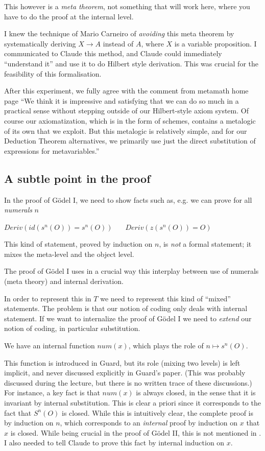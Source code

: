 \documentclass[11pt]{article}
\theoremstyle{plain}
\theoremstyle{definition}
\theoremstyle{remark}
\newcommand{\rta}{\rightarrow}
\begin{document}
This however is a {\em meta theorem}, not something that will work here, where you have to do the
proof at the internal level.

I knew the technique of Mario Carneiro \cite{Carneiro} of {\em avoiding} this meta theorem
by systematically deriving $X\rta A$ instead of $A$, where $X$ is a variable proposition.
I communicated to Claude this method, and Claude could immediately ``understand it'' and use
it to do Hilbert style derivation. This was crucial for the feasibility of this formalisation.

After this experiment, we fully agree with the comment from metamath home page
``We think it is impressive and satisfying that we can do so much in a practical sense without stepping outside of our
Hilbert-style axiom system. Of course our axiomatization, which is in the form of schemes, contains a metalogic of its own that we
exploit. But this metalogic is relatively simple, and for our Deduction Theorem alternatives, we primarily use just the direct
substitution of expressions for metavariables.''

\subsection{A subtle point in the proof}

In the proof of G\"odel I, we need to show facts such as, e.g. 
we can prove for all {\em numerals} $n$

$Deriv(id(s^n(O)) = s^{n}(O))~~~~~~~~Deriv(z(s^n(O)) = O)$

This kind of statement, proved by induction on $n$, is {\em not}
a formal statement; it mixes the meta-level 
and the object level.

The proof of G\"odel I uses in a crucial way this interplay between
use of numerals (meta theory) and internal derivation. 

In order to represent this in $T$ we need to represent this kind of ``mixed'' statements.
The problem is that our notion of coding only deals with internal statement. If we want
to internalize the proof of G\"odel I we need to {\em extend} our notion of coding, in
particular substitution.

We have an internal function $num(x)$, which plays the role of $n\mapsto s^n(O)$.

This function is introduced in Guard, but its role (mixing two levels)
is left implicit, and never discussed explicitly in Guard's paper. (This was probably discussed
during the lecture, but there is no written trace of these discussions.)
For instance, a key fact is that $num(x)$ is always closed, in the sense that it is invariant by
internal substitution. This is clear a priori since it corresponds to the fact that $S^n(O)$ is closed.
While this is intuitively clear, the complete proof is by induction on $n$, which corresponds to
an {\em internal} proof by induction on $x$ that $x$ is closed. While being crucial in the proof
of G\"odel II, this is not mentioned in \cite{Guard63}. I also needed to tell Claude to prove this fact
by internal induction on $x$.
\end{document}
